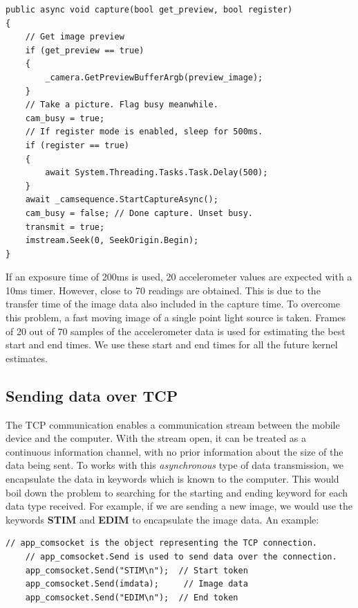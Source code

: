 \documentclass[BTech]{iitmdiss}
\begin{document}
\begin{singlespacing}
\begin{lstlisting}[style=sharpclisting]
public async void capture(bool get_preview, bool register)
{
    // Get image preview
    if (get_preview == true)
    {
        _camera.GetPreviewBufferArgb(preview_image);
    }
    // Take a picture. Flag busy meanwhile.
    cam_busy = true;
    // If register mode is enabled, sleep for 500ms.
    if (register == true)
    {
        await System.Threading.Tasks.Task.Delay(500);
    }
    await _camsequence.StartCaptureAsync();
    cam_busy = false; // Done capture. Unset busy.
    transmit = true;
    imstream.Seek(0, SeekOrigin.Begin);
}
\end{lstlisting}
\end{singlespacing}

If an exposure time of 200ms is used, 20 accelerometer values are 
expected with a 10ms timer. However, close to 70 readings are obtained.
This is due to the transfer time of the image data also included in the
capture time. To overcome this problem, a fast moving image of a single
point light source is taken. Frames of 20 out of 70 samples of the
accelerometer data is used for estimating the best start and end times.
We use these start and end times for all the future kernel estimates.

\subsection{Sending data over TCP}
\label{device:device_app:tcp}
The TCP communication enables a communication stream between the mobile
device and the computer. With the stream open, it can be treated as a 
continuous information channel, with no prior information about the size
of the data being sent. To works with this \emph{asynchronous} type of
data transmission, we encapsulate the data in keywords which is known to
the computer. This would boil down the problem to searching for the 
starting and ending keyword for each data type received. For example, if
we are sending a new image, we would use the keywords \textbf{STIM} and
\textbf{EDIM} to encapsulate the image data. An example: 

\begin{singlespacing}
\begin{lstlisting}[style=sharpclisting]
    // app_comsocket is the object representing the TCP connection.
    // app_comsocket.Send is used to send data over the connection.
    app_comsocket.Send("STIM\n");  // Start token
    app_comsocket.Send(imdata);     // Image data
    app_comsocket.Send("EDIM\n");  // End token
\end{lstlisting}
\end{singlespacing}
\end{document}
